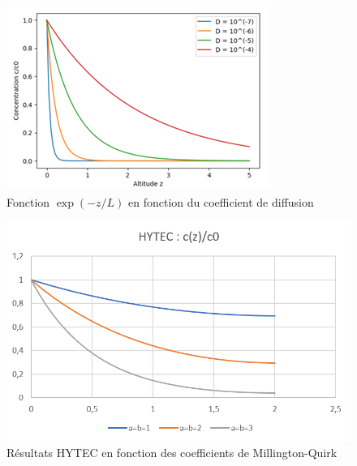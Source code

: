 \documentclass{article}
\begin{document}
\begin{figure}[H]
    \centering
    \includegraphics[height = 0.4 \textheight]{III_C_8.png}
    \caption{Fonction $\exp(-z/L)$ en fonction du coefficient de diffusion}
    \label{fig:sens_diffusion}
\end{figure}

\begin{figure}[H]
    \centering
    \includegraphics[height = 0.4 \textheight]{III_C_10.png}
    \caption{Résultats HYTEC en fonction des coefficients de Millington-Quirk}
    \label{fig:sens_hytec_mq}
\end{figure}


\end{document}
